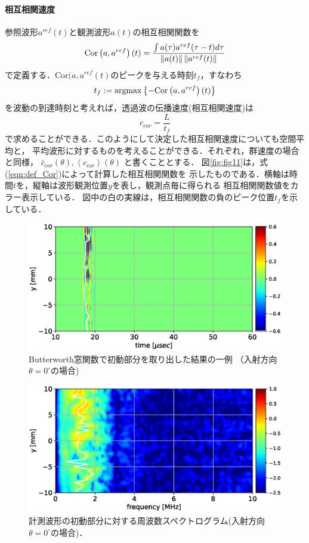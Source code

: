 \paragraph{相互相関速度}
参照波形$a^{ref}(t)$と観測波形$a(t)$の相互相関関数を
\begin{equation}
	{\rm Cor}\left(a,a^{ref}\right)(t)=
	\frac{
	\int a(\tau)a^{ref}(\tau-t) d\tau
	}{
		\left\| a(t)\right\|
		\left\| a^{ref}(t)\right\|
	}
	\label{eqn:def_Cor}
\end{equation}
で定義する．Cor$(a,a^{ref}(t)$のピークを与える時刻$t_{f}$，すなわち
\begin{equation}
	t_{f}:={\rm argmax} \left\{
		-{\rm Cor}\left(a,a^{ref}\right)(t)
		\right\}
	\label{eqn:def_tof}
\end{equation}
を波動の到達時刻と考えれば，透過波の伝播速度(相互相関速度)は
\begin{equation}
	c_{cor}=\frac{L}{t_{f}}
	\label{eqn:}
\end{equation}
で求めることができる．このようにして決定した相互相関速度についても空間平均と，
平均波形に対するものを考えることができる．それぞれ，群速度の場合と同様，
$\bar c_{cor}(\theta), \left< c_{cor}\right>(\theta)$
と書くこととする．
図\ref{fig:fig11}は，式(\ref{eqn:def_Cor})によって計算した相互相関関数を
示したものである．横軸は時間$t$を，縦軸は波形観測位置$y$を表し，観測点毎に得られる
相互相関関数値をカラー表示している．
図中の白の実線は，相互相関関数の負のピーク位置$t_{f}$を示している．
\begin{figure}[h]
	\begin{center}
	\includegraphics[width=0.7\linewidth]{Figs/fig6.eps} 
	\end{center}
	\caption{
		Butterworth窓関数で初動部分を取り出した結果の一例
		（入射方向$\theta=0^{\circ}$の場合)
	} 
	\label{fig:fig6}
\end{figure}
\begin{figure}[h]
	\begin{center}
	\includegraphics[width=0.7\linewidth]{Figs/fig7.eps} 
	\end{center}
	\caption{
		計測波形の初動部分に対する周波数スペクトログラム(入射方向$\theta=0^{\circ}$の場合)．
	} 
	\label{fig:fig7}
\end{figure}

